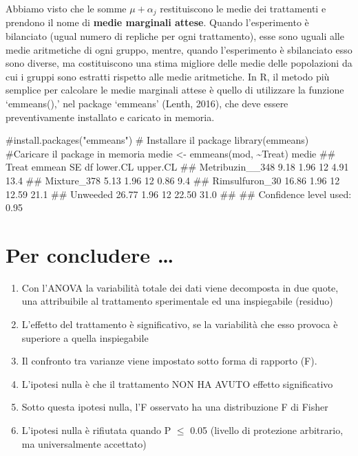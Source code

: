 \documentclass[a4paper,12pt,oneside]{book}
\providecommand{\tightlist}{%
  \setlength{\itemsep}{0pt}\setlength{\parskip}{0pt}}
\newenvironment{Shaded}{\begin{snugshade}}{\end{snugshade}}
\newcommand{\SpecialCharTok}[1]{#1}
\newcommand{\CommentTok}[1]{#1}
\newcommand{\DocumentationTok}[1]{#1}
\newcommand{\OtherTok}[1]{#1}
\newcommand{\FunctionTok}[1]{#1}
\newcommand{\NormalTok}[1]{#1}
\begin{document}
Abbiamo visto che le somme \(\mu + \alpha_j\) restituiscono le medie dei trattamenti e prendono il nome di \textbf{medie marginali attese}. Quando l'esperimento è bilanciato (ugual numero di repliche per ogni trattamento), esse sono uguali alle medie aritmetiche di ogni gruppo, mentre, quando l'esperimento è sbilanciato esso sono diverse, ma costituiscono una stima migliore delle medie delle popolazioni da cui i gruppi sono estratti rispetto alle medie aritmetiche. In R, il metodo più semplice per calcolare le medie marginali attese è quello di utilizzare la funzione `emmeans(),' nel package `emmeans' (Lenth, 2016), che deve essere preventivamente installato e caricato in memoria.

\begin{Shaded}
\begin{Highlighting}[]
\CommentTok{\#install.packages("emmeans") \# Installare il package}
\FunctionTok{library}\NormalTok{(emmeans) }\CommentTok{\#Caricare il package in memoria}
\NormalTok{medie }\OtherTok{\textless{}{-}} \FunctionTok{emmeans}\NormalTok{(mod, }\SpecialCharTok{\textasciitilde{}}\NormalTok{Treat)}
\NormalTok{medie}
\DocumentationTok{\#\#  Treat           emmean   SE df lower.CL upper.CL}
\DocumentationTok{\#\#  Metribuzin\_\_348   9.18 1.96 12     4.91     13.4}
\DocumentationTok{\#\#  Mixture\_378       5.13 1.96 12     0.86      9.4}
\DocumentationTok{\#\#  Rimsulfuron\_30   16.86 1.96 12    12.59     21.1}
\DocumentationTok{\#\#  Unweeded         26.77 1.96 12    22.50     31.0}
\DocumentationTok{\#\# }
\DocumentationTok{\#\# Confidence level used: 0.95}
\end{Highlighting}
\end{Shaded}

\hypertarget{per-concludere}{%
\section{Per concludere \ldots{}}\label{per-concludere}}

\begin{enumerate}
\def\labelenumi{\arabic{enumi}.}
\tightlist
\item
  Con l'ANOVA la variabilità totale dei dati viene decomposta in due quote, una attribuibile al trattamento sperimentale ed una inspiegabile (residuo)
\item
  L'effetto del trattamento è significativo, se la variabilità che esso provoca è superiore a quella inspiegabile
\item
  Il confronto tra varianze viene impostato sotto forma di rapporto (F).
\item
  L'ipotesi nulla è che il trattamento NON HA AVUTO effetto significativo
\item
  Sotto questa ipotesi nulla, l'F osservato ha una distribuzione F di Fisher
\item
  L'ipotesi nulla è rifiutata quando P \(\leq\) 0.05 (livello di protezione arbitrario, ma universalmente accettato)
\end{enumerate}
\end{document}
